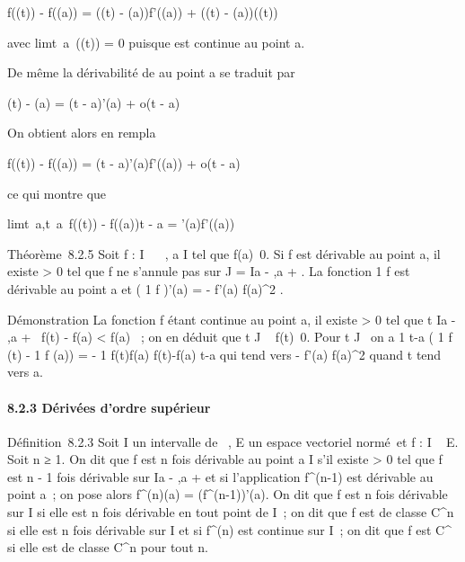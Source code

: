 f(\phi(t)) - f(\phi(a)) = (\phi(t) - \phi(a))f'(\phi(a)) + (\phi(t) - \phi(a))\epsilon(\phi(t))

avec limt\rightarrow~a~\epsilon(\phi(t)) = 0 puisque \phi est
continue au point a.

De même la dérivabilité de \phi au point a se traduit par

\phi(t) - \phi(a) = (t - a)\phi'(a) + o(t - a)

On obtient alors en rempla\ccant

f(\phi(t)) - f(\phi(a)) = (t - a)\phi'(a)f'(\phi(a)) + o(t - a)

ce qui montre que

limt\rightarrow~a,t\neq~a~f(\phi(t))
- f(\phi(a))\over t - a = \phi'(a)f'(\phi(a))

Théorème~8.2.5 Soit f : I \rightarrow~ ~, a \in I tel que
f(a)\neq~0. Si f est dérivable au point a, il
existe \epsilon \textgreater{} 0 tel que f ne s'annule pas sur J = I\bigcap{]}a - \epsilon,a
+ \epsilon{[}. La fonction  1 \over f est dérivable au point
a et \left ( 1 \over f
\right )'(a) = - f'(a) \over
f(a)^2 .

Démonstration La fonction f étant continue au point a, il existe \epsilon
\textgreater{} 0 tel que t \in I\bigcap{]}a - \epsilon,a + \epsilon{[}\rigtharrow~\textbar{}f(t) -
f(a)\textbar{} \textless{} \textbar{}f(a)\textbar{}
 ~; on en déduit que t \in J \rigtharrow~
f(t)\neq~0. Pour t \in J
\diagdown\a\ on a  1 \over
t-a \left ( 1 \over f (t) - 1
\over f (a)\right ) = - 1
\over f(t)f(a)  f(t)-f(a) \over t-a
qui tend vers - f'(a) \over f(a)^2 quand t
tend vers a.

\paragraph{8.2.3 Dérivées d'ordre supérieur}

Définition~8.2.3 Soit I un intervalle de ~, E un espace vectoriel
normé~et f : I \rightarrow~ E. Soit n ≥ 1. On dit que f est n fois dérivable au
point a \in I s'il existe \eta \textgreater{} 0 tel que f est n - 1 fois
dérivable sur I\bigcap{]}a - \eta,a + \eta{[} et si l'application f^(n-1)
est dérivable au point a~; on pose alors f^(n)(a) =
(f^(n-1))'(a). On dit que f est n fois dérivable sur I si
elle est n fois dérivable en tout point de I~; on dit que f est de
classe C^n si elle est n fois dérivable sur I et si
f^(n) est continue sur I~; on dit que f est C^\infty~ si
elle est de classe C^n pour tout n.

